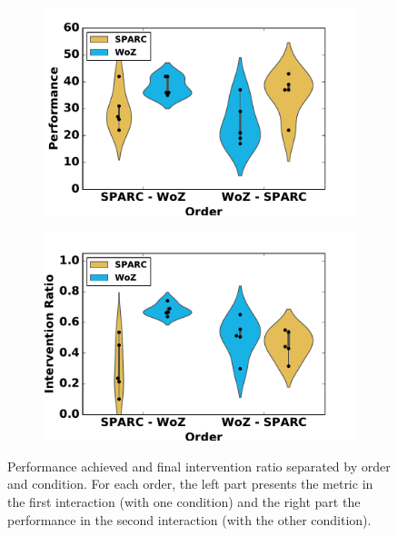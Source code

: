 \begin{figure}[ht]
	\centering
	\begin{subfigure}[t]{0.5\textwidth}
		\centering
		\includegraphics[width=1.\textwidth]{perf_divided.pdf}
	\end{subfigure}%
	\begin{subfigure}[t]{0.5\textwidth}
		\centering
		\includegraphics[width=1.\textwidth]{ratio_divided.pdf}
	\end{subfigure}
	\caption{Performance achieved and final intervention ratio separated by order and condition. For each order, the left part presents the metric in the first interaction (with one condition) and the right part the performance in the second interaction (with the other condition).}
	\label{fig:woz_separated}
\end{figure}

